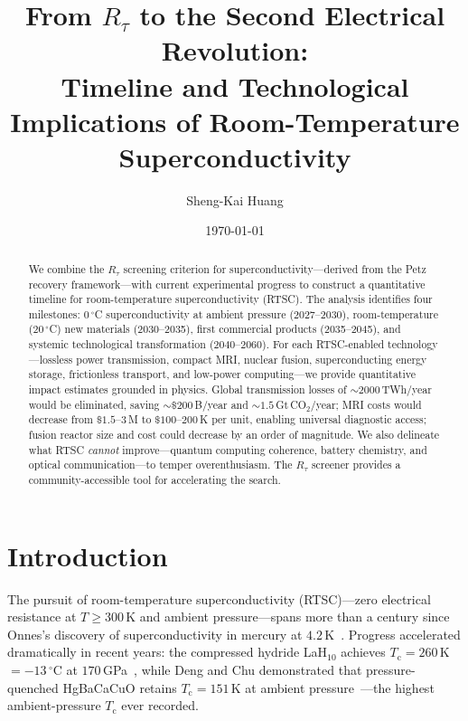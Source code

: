 \documentclass[prl,twocolumn,superscriptaddress,longbibliography,floatfix]{revtex4-2}
\newcommand{\tauasym}{\tau}
\newcommand{\Rtau}{R_{\tauasym}}
\newcommand{\Tc}{T_{\mathrm{c}}}
\begin{document}
\title{From $R_\tau$ to the Second Electrical Revolution:\\
Timeline and Technological Implications of Room-Temperature Superconductivity}

\author{Sheng-Kai Huang}

\date{\today}

\begin{abstract}
We combine the $\Rtau$ screening criterion for
superconductivity---derived from the Petz recovery
framework---with current experimental progress to construct
a quantitative timeline for room-temperature superconductivity
(RTSC).  The analysis identifies four milestones:
$0\,^\circ$C superconductivity at ambient pressure (2027--2030),
room-temperature ($20\,^\circ$C) new materials (2030--2035),
first commercial products (2035--2045), and systemic
technological transformation (2040--2060).  For each
RTSC-enabled technology---lossless power transmission, compact
MRI, nuclear fusion, superconducting energy storage,
frictionless transport, and low-power computing---we provide
quantitative impact estimates grounded in physics.  Global
transmission losses of $\sim 2000\,$TWh/year would be
eliminated, saving $\sim \$200\,$B/year and
$\sim 1.5\,$Gt\,CO$_2$/year; MRI costs would decrease from
$\$1.5$--$3\,$M to $\$100$--$200\,$K per unit, enabling
universal diagnostic access; fusion reactor size and cost
could decrease by an order of magnitude.  We also delineate
what RTSC \emph{cannot} improve---quantum computing coherence,
battery chemistry, and optical communication---to temper
overenthusiasm.  The $\Rtau$ screener provides a
community-accessible tool for accelerating the search.
\end{abstract}

\maketitle

\section{Introduction}
\label{sec:intro}

The pursuit of room-temperature superconductivity (RTSC)---zero
electrical resistance at $T \geq 300\,$K and ambient
pressure---spans more than a century since Onnes's discovery of
superconductivity in mercury at $4.2\,$K~\cite{Onnes1911}.
Progress accelerated dramatically in recent years:
the compressed hydride LaH$_{10}$ achieves
$\Tc = 260\,$K $= -13\,^\circ$C at $170\,$GPa~\cite{Somayazulu2019,Drozdov2019},
while Deng and Chu demonstrated that pressure-quenched
HgBaCaCuO retains $\Tc = 151\,$K at ambient
pressure~\cite{DengChu2026}---the highest ambient-pressure
$\Tc$ ever recorded.
\end{document}

